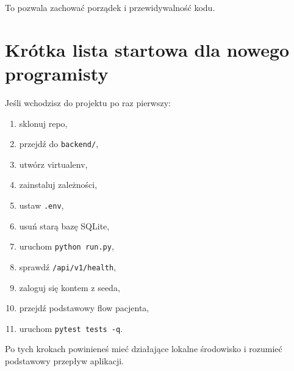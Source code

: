 \documentclass[11pt,a4paper]{article}
\begin{document}
To pozwala zachować porządek i przewidywalność kodu.

\section{Krótka lista startowa dla nowego programisty}

Jeśli wchodzisz do projektu po raz pierwszy:
\begin{enumerate}[leftmargin=1.2cm]
    \item sklonuj repo,
    \item przejdź do \texttt{backend/},
    \item utwórz virtualenv,
    \item zainstaluj zależności,
    \item ustaw \texttt{.env},
    \item usuń starą bazę SQLite,
    \item uruchom \texttt{python run.py},
    \item sprawdź \texttt{/api/v1/health},
    \item zaloguj się kontem z seeda,
    \item przejdź podstawowy flow pacjenta,
    \item uruchom \texttt{pytest tests -q}.
\end{enumerate}

Po tych krokach powinieneś mieć działające lokalne środowisko i rozumieć podstawowy przepływ aplikacji.
\end{document}
